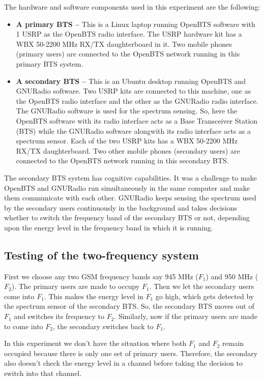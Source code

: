 The hardware and software components used in this experiment are the 
following:
\begin{itemize}
    \item \textbf{A primary BTS --} This is a Linux laptop running OpenBTS
    software with 1 USRP as the OpenBTS radio interface. The USRP hardware kit
    has a WBX 50-2200 MHz RX/TX daughterboard in it. Two mobile phones 
    (primary users) are connected to the OpenBTS network running in this 
    primary BTS system.
    \item \textbf{A secondary BTS --} This is an Ubuntu desktop running
    OpenBTS and GNURadio software. Two USRP kits are connected to this
    machine, one as the OpenBTS radio interface and the other as the GNURadio
    radio interface. The GNURadio software is used for the spectrum sensing. 
    So, here the OpenBTS software with its radio interface acts as a Base
    Transceiver Station (BTS) while the GNURadio software alongwith its radio
    interface acts as a spectrum sensor. Each of the two USRP kits has a
    WBX 50-2200 MHz RX/TX daughterboard. Two other mobile phones (secondary 
    users) are connected to the OpenBTS network running in this secondary BTS.
\end{itemize}

The secondary BTS system has cognitive capabilities. It was a challenge to 
make OpenBTS and GNURadio run simultaneously in the same computer and make 
them communicate with each other. GNURadio keeps sensing the spectrum used by
the secondary users continuously in the background and takes decisions whether
to switch the frequency band of the secondary BTS or not, depending upon the 
energy level in the frequency band in which it is running.

\subsection{Testing of the two-frequency system}
First we choose any two GSM frequency bands say 945 MHz ($F_1$) and 950 MHz 
($F_2$). The primary users are made to occupy $F_1$. Then we let the secondary
users come into $F_1$. This makes the energy level in $F_1$ go high, which 
gets detected by the spectrum sensor of the secondary BTS. So, the secondary 
BTS moves out of $F_1$ and switches its frequency to $F_2$. Similarly, now if 
the primary users are made to come into $F_2$, the secondary switches back to 
$F_1$.

In this experiment we don't have the situation where both $F_1$ and $F_2$ 
remain occupied because there is only one set of primary users. Therefore, the 
secondary also doesn't check the energy level in a channel before taking the
decision to switch into that channel.

